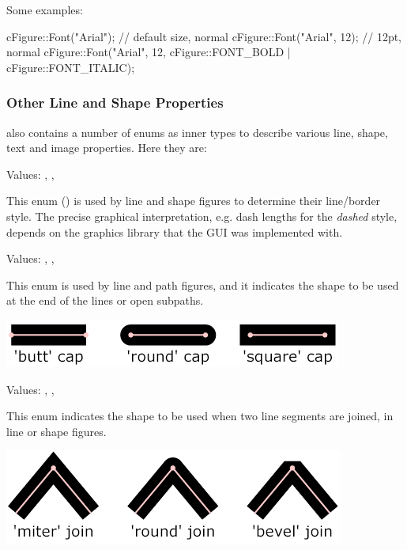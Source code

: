 Some examples:

\begin{cpp}
cFigure::Font("Arial");  // default size, normal
cFigure::Font("Arial", 12);  // 12pt, normal
cFigure::Font("Arial", 12, cFigure::FONT_BOLD | cFigure::FONT_ITALIC);
\end{cpp}


\subsubsection{Other Line and Shape Properties}

 also contains a number of enums as inner types to describe
various line, shape, text and image properties. Here they are:


Values: , , 

This enum () is used by line and shape figures
to determine their line/border style. The precise graphical interpretation,
e.g. dash lengths for the \textit{dashed} style, depends on the graphics
library that the GUI was implemented with.


Values: , , 

This enum is used by line and path figures, and it indicates the shape to
be used at the end of the lines or open subpaths.

\begin{center}
\includegraphics[scale=0.8]{figures/graphics-linecaps}
\end{center}


Values: , , 

This enum indicates the shape to be used when two line segments are joined,
in line or shape figures.

\begin{center}
\includegraphics[scale=0.8]{figures/graphics-linejoins}
\end{center}


